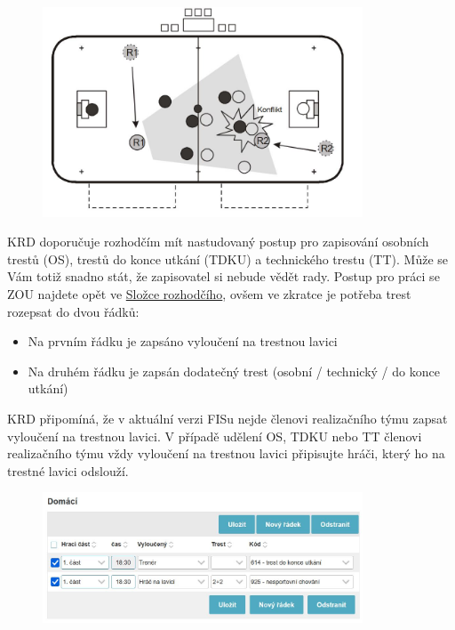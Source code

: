 \documentclass{newsletter_2025}
\begin{document}
\begin{figure}[h]
	\centering
	\includegraphics[width=0.85\textwidth, keepaspectratio]{konflikt}
\end{figure}

\clearpage
KRD doporučuje rozhodčím mít nastudovaný postup pro zapisování osobních trestů (OS), trestů do konce utkání (TDKU) a technického trestu (TT). Může se Vám totiž snadno stát, že zapisovatel si nebude vědět rady. Postup pro práci se ZOU najdete opět ve \href{https://www.ceskyflorbal.cz/data/document/20240902/171344_86ae_Slozka-rozhodciho.pdf}{Složce rozhodčího}, ovšem ve zkratce je potřeba trest rozepsat do dvou řádků:
\begin{itemize}
	\item Na prvním řádku je zapsáno vyloučení na trestnou lavici
	\item Na druhém řádku je zapsán dodatečný trest (osobní / technický / do konce utkání) 
\end{itemize}
KRD připomíná, že v aktuální verzi FISu nejde členovi realizačního týmu zapsat vyloučení na trestnou lavici. V případě udělení OS, TDKU nebo TT členovi realizačního týmu vždy vyloučení na trestnou lavici připisujte hráči, který ho na trestné lavici odslouží.

\begin{figure}[h]
	\centering
	\includegraphics[width=0.85\textwidth, keepaspectratio]{zapsani_tdku_trener}
\end{figure}
\end{document}
